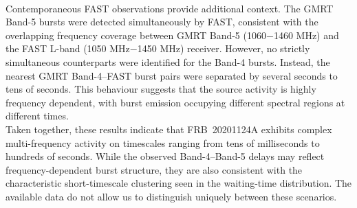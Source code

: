 \documentclass[preprint2, trackchanges]{aastex631}
\begin{document}
\\
Contemporaneous FAST observations provide additional context. The GMRT Band-5 bursts were detected simultaneously by FAST, consistent with the overlapping frequency coverage between GMRT Band-5 (1060$-$1460 MHz) and the FAST L-band (1050 MHz$-$1450 MHz) receiver. However, no strictly simultaneous counterparts were identified for the Band-4 bursts. Instead, the nearest GMRT Band-4--FAST burst pairs were separated by several seconds to tens of seconds. This behaviour suggests that the source activity is highly frequency dependent, with burst emission occupying different spectral regions at different times.
\\
Taken together, these results indicate that FRB~20201124A exhibits complex multi-frequency activity on timescales ranging from tens of milliseconds to hundreds of seconds. While the observed Band-4--Band-5 delays may reflect frequency-dependent burst structure, they are also consistent with the characteristic short-timescale clustering seen in the waiting-time distribution. The available data do not allow us to distinguish uniquely between these scenarios.


\end{document}
